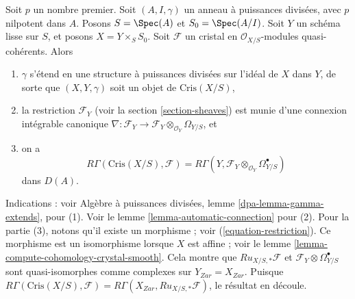 \begin{remark}[Comparaison]
\label{remark-comparison}
Soit $p$ un nombre premier. Soit $(A, I, \gamma)$ un anneau à puissances
divisées, avec $p$ nilpotent dans $A$. Posons $S = \Spec(A)$ et
$S_0 = \Spec(A/I)$. Soit $Y$ un schéma lisse sur $S$, et posons
$X = Y \times_S S_0$. Soit
$\mathcal{F}$ un cristal en $\mathcal{O}_{X/S}$-modules quasi-cohérents.
Alors
\begin{enumerate}
\item $\gamma$ s'étend en une structure à puissances divisées sur l'idéal
de $X$ dans $Y$, de sorte que $(X, Y, \gamma)$ soit un objet de $\text{Cris}(X/S)$,
\item la restriction $\mathcal{F}_Y$ (voir la section \ref{section-sheaves})
est munie d'une connexion intégrable canonique
$\nabla : \mathcal{F}_Y \to
\mathcal{F}_Y \otimes_{\mathcal{O}_Y} \Omega_{Y/S}$, et
\item on a
$$
R\Gamma(\text{Cris}(X/S), \mathcal{F}) =
R\Gamma(Y, \mathcal{F}_Y \otimes_{\mathcal{O}_Y} \Omega^\bullet_{Y/S})
$$
dans $D(A)$.
\end{enumerate}
Indications : voir Algèbre à puissances divisées, lemme \ref{dpa-lemma-gamma-extends}, pour (1).
Voir le lemme \ref{lemma-automatic-connection} pour (2).
Pour la partie (3), notons qu'il existe un morphisme ; voir
(\ref{equation-restriction}). Ce morphisme est un isomorphisme lorsque
$X$ est affine ; voir le
lemme \ref{lemma-compute-cohomology-crystal-smooth}.
Cela montre que $Ru_{X/S, *}\mathcal{F}$ et
$\mathcal{F}_Y \otimes \Omega^\bullet_{Y/S}$ sont quasi-isomorphes
comme complexes sur $Y_{Zar} = X_{Zar}$.
Puisque $R\Gamma(\text{Cris}(X/S), \mathcal{F}) =
R\Gamma(X_{Zar}, Ru_{X/S, *}\mathcal{F})$, le résultat en découle.
\end{remark}

